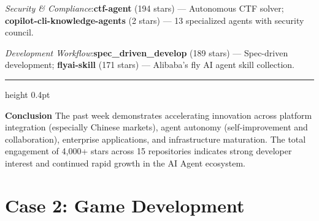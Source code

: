 \begin{mdframed}[
  linewidth=0.8pt,
  linecolor=black!40,
  backgroundcolor=black!2,
  innertopmargin=16pt,
  innerbottommargin=16pt,
  innerleftmargin=18pt,
  innerrightmargin=18pt,
  roundcorner=4pt
]
\noindent\textit{Security \& Compliance}:\quad \textbf{ctf-agent} (194 stars) --- Autonomous CTF solver; \textbf{copilot-cli-knowledge-agents} (2 stars) --- 13 specialized agents with security council.

\noindent\textit{Development Workflow}:\quad \textbf{spec\_driven\_develop} (189 stars) --- Spec-driven development; \textbf{flyai-skill} (171 stars) --- Alibaba's fly AI agent skill collection.

\hrule height 0.4pt

\noindent\textbf{Conclusion}\quad
The past week demonstrates accelerating innovation across platform integration (especially Chinese markets), agent autonomy (self-improvement and collaboration), enterprise applications, and infrastructure maturation. The total engagement of 4,000+ stars across 15 repositories indicates strong developer interest and continued rapid growth in the AI Agent ecosystem.


\end{mdframed}
\newpage
\section{Case 2: Game Development}
\label{sec: game-dev}

